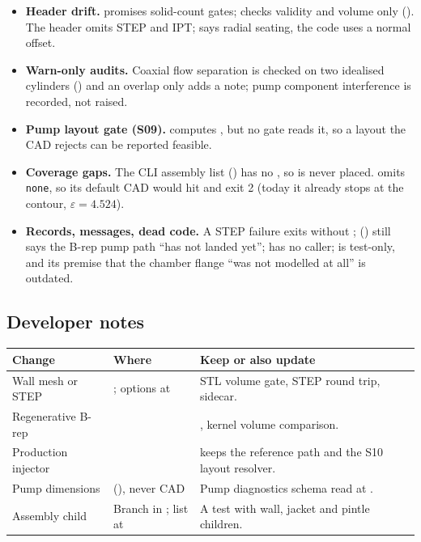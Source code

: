 \begin{itemize}
\item \textbf{Header drift.}  promises solid-count gates;  checks validity and volume only (). The  header omits STEP and IPT;  says radial seating, the code uses a normal offset.
\item \textbf{Warn-only audits.} Coaxial flow separation is checked on two idealised cylinders () and an overlap only adds a note; pump component interference is recorded, not raised.
\item \textbf{Pump layout gate (S09).}  computes , but no gate reads it, so a layout the CAD rejects can be reported feasible.
\item \textbf{Coverage gaps.} The CLI assembly list () has no , so  is never placed.  omits  \texttt{none}, so its default CAD would hit  and exit 2 (today it already stops at the contour, $\varepsilon = 4.524$).
\item \textbf{Records, messages, dead code.} A STEP failure exits without ;  () still says the B-rep pump path ``has not landed yet'';  has no caller;  is test-only, and its premise that the chamber flange ``was not modelled at all'' is outdated.
\end{itemize}

\subsection{Developer notes}

\begingroup\footnotesize
\begin{longtable}{@{}P{3.0cm}P{6.4cm}P{6.6cm}@{}}
\toprule
\textbf{Change} & \textbf{Where} & \textbf{Keep or also update} \\
\midrule
\endhead
Wall mesh or STEP & ; options at  & STL volume gate, STEP round trip, sidecar. \\
Regenerative B-rep &  & , kernel volume comparison. \\
Production injector &  &  keeps the reference path and the S10 layout resolver. \\
Pump dimensions &  (), never CAD & Pump diagnostics schema read at . \\
Assembly child & Branch in ; list at  & A test with wall, jacket and pintle children. \\
\bottomrule
\end{longtable}
\endgroup

